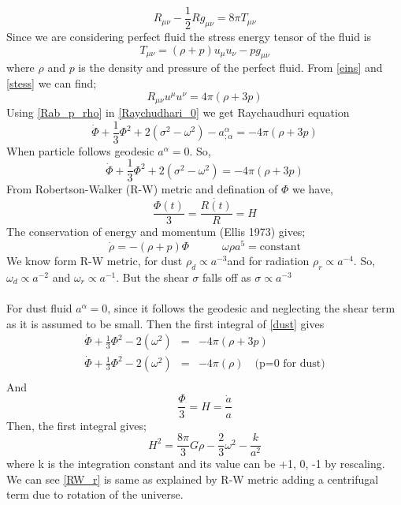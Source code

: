 \begin{equation}\label{eins}
R_{\mu\nu}-\frac{1}{2} R g_{\mu\nu}= 8\pi T_{\mu\nu}
\end{equation}
Since we are considering perfect fluid the stress energy tensor of the fluid is
\begin{equation}\label{stess}
T_{\mu\nu}=(\rho+p)u_\mu u_\nu -pg_{\mu\nu}
\end{equation}
where $\rho$ and $p$ is the density and pressure of the perfect fluid.
From \eqref{eins} and \eqref{stess} we can find;
\begin{equation}\label{Rab_p_rho}
R_{\mu\nu}u^\mu u^\nu=4\pi(\rho +3p)
\end{equation}
Using \eqref{Rab_p_rho} in \eqref{Raychudhari_0} we get Raychaudhuri equation
\begin{equation}\label{Raychaudhuri}
\dot{\Phi}+\frac{1}{3}\Phi^2+2(\sigma^2-\omega^2)-a^\alpha_{;\alpha}=-4\pi(\rho +3p)
\end{equation}
When particle follows geodesic $a^\alpha=0$. So,
\begin{equation}\label{dust}
\dot{\Phi}+\frac{1}{3}\Phi^2+2(\sigma^2-\omega^2)=-4\pi(\rho +3p)
\end{equation}
From Robertson-Walker (R-W) metric and defination of $\Phi$ we have,
\begin{equation}
\frac{\Phi(t)}{3}=\frac{\dot{R(t)}}{R}=H
\end{equation}
The conservation of energy and momentum (Ellis 1973) gives;
\begin{equation}
\dot{\rho}=-(\rho+p)\Phi\quad\quad\quad \omega\rho a^5= \text{constant}
\end{equation}
We know form R-W metric, for dust $\rho_d\propto a^{-3} $and for radiation $\rho_r\propto a^{-4}$. So, $\omega_d\propto a^{-2}$ and $\omega_r\propto a^{-1}$. But the shear $\sigma$ falls off as $\sigma \propto a^{-3}$\\\\
For dust fluid $a^\alpha=0$, since it follows the geodesic and neglecting the shear term as it is assumed to be small. Then the first integral of \eqref{dust} gives
\begin{eqnarray*}
\dot{\Phi}+\frac{1}{3}\Phi^2-2(\omega^2)&=&-4\pi(\rho +3p)\\
\dot{\Phi}+\frac{1}{3}\Phi^2-2(\omega^2)&=&-4\pi(\rho)\quad\text{(p=0 for dust)}\\
\end{eqnarray*}
And \begin{equation}\frac{\Phi}{3}=H=\frac{\dot{a}}{a}\end{equation} Then, the first integral gives;
\begin{equation}\label{RW_r}
H^2=\frac{8\pi}{3} G\rho-\frac{2}{3}\omega^2-\frac{k}{a^2}
\end{equation}
where k is the integration constant and its value can be +1, 0, -1 by rescaling.\\
We can see \eqref{RW_r} is same as explained by R-W metric adding a centrifugal term due to rotation of the universe.

